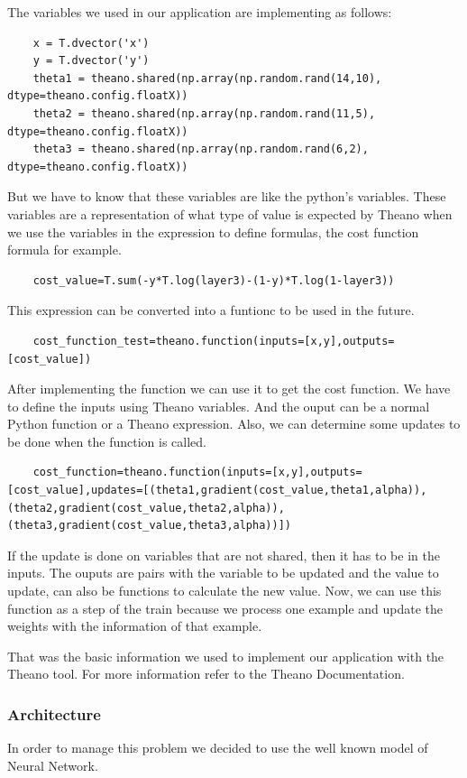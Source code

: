 \documentclass[12pt]{article}
\begin{document}
The variables we used in our application are implementing as follows:
\begin{lstlisting}
    x = T.dvector('x') 
    y = T.dvector('y') 
    theta1 = theano.shared(np.array(np.random.rand(14,10), dtype=theano.config.floatX))
    theta2 = theano.shared(np.array(np.random.rand(11,5), dtype=theano.config.floatX))
    theta3 = theano.shared(np.array(np.random.rand(6,2), dtype=theano.config.floatX))
\end{lstlisting}
But we have to know that these variables are like the python's variables. These variables are a representation of what type of value is expected by Theano when we use the variables in the expression to define formulas, the cost function formula for example.
\begin{lstlisting}
	cost_value=T.sum(-y*T.log(layer3)-(1-y)*T.log(1-layer3))
\end{lstlisting}
This expression can be converted into a funtionc to be used in the future.
\begin{lstlisting}
    cost_function_test=theano.function(inputs=[x,y],outputs=[cost_value])
\end{lstlisting}
After implementing the function we can use it to get the cost function. We have to define the inputs using Theano variables. And the ouput can be a normal Python function or a Theano expression. Also, we can determine some updates to be done when the function is called.
\begin{lstlisting}
    cost_function=theano.function(inputs=[x,y],outputs=[cost_value],updates=[(theta1,gradient(cost_value,theta1,alpha)),(theta2,gradient(cost_value,theta2,alpha)),(theta3,gradient(cost_value,theta3,alpha))])    
\end{lstlisting}
If the update is done on variables that are not shared, then it has to be in the inputs. The ouputs are pairs with the variable to be updated and the value to update, can also be functions to calculate the new value. Now, we can use this function as a step of the train because we process one example and update the weights with the information of that example.

That was the basic information we used to implement our application with the Theano tool. For more information refer to the Theano Documentation.
\subsubsection{Architecture}
In order to manage this problem we decided to use the well known model of Neural Network. 
\end{document}
